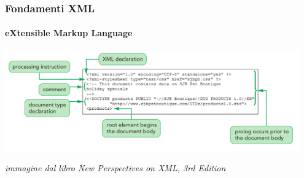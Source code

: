 \begin{frame}
	\frametitle{Fondamenti XML}
	\framesubtitle{eXtensible Markup Language}
	\addtocounter{nframe}{1}

	\begin{center}
		\includegraphics[width=0.95\textwidth]{imgs/XML-Prologo.png}
    \end{center}
\begin{tiny}\textit{immagine dal libro New Perspectives on XML, 3rd Edition}\end{tiny}

\end{frame}






